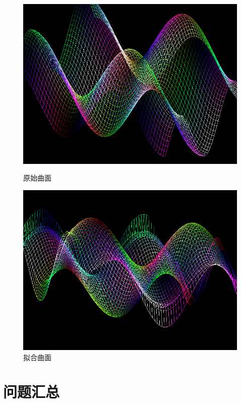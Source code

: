 \documentclass[10pt]{article}
\begin{document}
\begin{figure}[H]
\begin{center}
\begin{minipage}[t]{0.45\linewidth}
\centering
\includegraphics[scale=0.35]{shape2_raw.png}
\caption{原始曲面}
\end{minipage}%
\begin{minipage}[t]{0.45\linewidth}
\centering
\includegraphics[scale=0.35]{shape2_out.png}
\caption{拟合曲面}
\end{minipage}
\end{center}
\end{figure}

\section{问题汇总}
\end{document}
